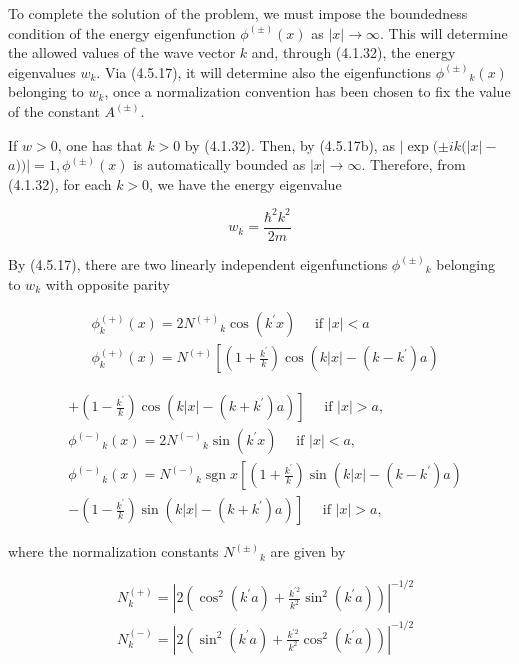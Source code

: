 \documentclass{article}
\begin{document}
To complete the solution of the problem, we must impose the boundedness condition of the energy eigenfunction $\phi^{( \pm)}(x)$ as $|x| \rightarrow \infty$. This will determine the allowed values of the wave vector $k$ and, through (4.1.32), the energy eigenvalues $w_{k}$. Via (4.5.17), it will determine also the eigenfunctions $\phi^{( \pm)}{ }_{k}(x)$ belonging to $w_{k}$, once a normalization convention has been chosen to fix the value of the constant $A^{( \pm)}$.

If $w>0$, one has that $k>0$ by (4.1.32). Then, by (4.5.17b), as $\mid \exp ( \pm i k(|x|-$ $a)) \mid=1, \phi^{( \pm)}(x)$ is automatically bounded as $|x| \rightarrow \infty$. Therefore, from (4.1.32), for each $k>0$, we have the energy eigenvalue
 
\begin{equation*}
w_{k}=\frac{\hbar^{2} k^{2}}{2 m} \tag{4.5.18}
\end{equation*}
 

By (4.5.17), there are two linearly independent eigenfunctions $\phi^{( \pm)}{ }_{k}$ belonging to $w_{k}$ with opposite parity
 
\begin{align*}
& \phi_{k}^{(+)}(x)=2 N^{(+)}{ }_{k} \cos \left(k^{\prime} x\right) \quad \text { if }|x|<a  \tag{4.5.19a}\\
& \phi_{k}^{(+)}(x)=N^{(+)}\left[\left(1+\frac{k^{\prime}}{k}\right) \cos \left(k|x|-\left(k-k^{\prime}\right) a\right)\right. \tag{4.5.19b}
\end{align*}
 
 
\begin{align*}
& \left.+\left(1-\frac{k^{\prime}}{k}\right) \cos \left(k|x|-\left(k+k^{\prime}\right) a\right)\right] \quad \text { if }|x|>a, \\
& \phi^{(-)}{ }_{k}(x)=2 N^{(-)}{ }_{k} \sin \left(k^{\prime} x\right) \quad \text { if }|x|<a,  \tag{4.5.19c}\\
& \phi^{(-)}{ }_{k}(x)=N^{(-)}{ }_{k} \operatorname{sgn} x\left[\left(1+\frac{k^{\prime}}{k}\right) \sin \left(k|x|-\left(k-k^{\prime}\right) a\right)\right.  \tag{4.5.19d}\\
& \left.-\left(1-\frac{k^{\prime}}{k}\right) \sin \left(k|x|-\left(k+k^{\prime}\right) a\right)\right] \quad \text { if }|x|>a,
\end{align*}
 
where the normalization constants $N^{( \pm)}{ }_{k}$ are given by
 
\begin{align*}
& N_{k}^{(+)}=\left|2\left(\cos ^{2}\left(k^{\prime} a\right)+\frac{k^{\prime 2}}{k^{2}} \sin ^{2}\left(k^{\prime} a\right)\right)\right|^{-1 / 2}  \tag{4.5.20a}\\
& N_{k}^{(-)}=\left|2\left(\sin ^{2}\left(k^{\prime} a\right)+\frac{k^{\prime 2}}{k^{2}} \cos ^{2}\left(k^{\prime} a\right)\right)\right|^{-1 / 2} \tag{4.5.20b}
\end{align*}
 
\end{document}
